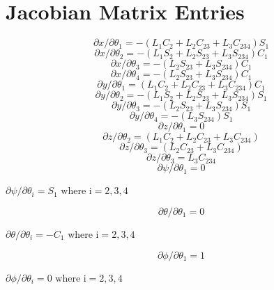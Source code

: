 \documentclass[paper=letter, fontsize=10pt]{scrartcl}	%
\numberwithin{equation}{section}															%
\numberwithin{figure}{section}																%
\numberwithin{table}{section}																%
\begin{document}
\newpage
\section{\\Jacobian Matrix Entries} \label{App:AppendixB}


\[\partial x/\partial {\theta _1} =  - ({L_1}{C_2} + {L_2}{C_{23}} + {L_3}{C_{234}}){S_1}\]
\[\partial x/\partial {\theta _2} =  - ({L_1}{S_2} + {L_2}{S_{23}} + {L_3}{S_{234}}){C_1}\]
\[\partial x/\partial {\theta _3} =  - ({L_2}{S_{23}} + {L_3}{S_{234}}){C_1}\]
\[\partial x/\partial {\theta _4} =  - ({L_2}{S_{23}} + {L_3}{S_{234}}){C_1}\]
\[\partial y/\partial {\theta _1} = ({L_1}{C_2} + {L_2}{C_{23}} + {L_3}{C_{234}}){C_1}\]
\[\partial y/\partial {\theta _2} =  - ({L_1}{S_2} + {L_2}{S_{23}} + {L_3}{S_{234}}){S_1}\]
\[\partial y/\partial {\theta _3} =  - ({L_2}{S_{23}} + {L_3}{S_{234}}){S_1}\]
\[\partial y/\partial {\theta _4} =  - ({L_3}{S_{234}}){S_1}\]
\[\partial z/\partial {\theta _1} = 0\]
\[\partial z/\partial {\theta _2} = ({L_1}{C_2} + {L_2}{C_{23}} + {L_3}{C_{234}})\]
\[\partial z/\partial {\theta _3} = ({L_2}{C_{23}} + {L_3}{C_{234}})\]
\[\partial z/\partial {\theta _3} = {L_3}{C_{234}}\]
\[\partial \psi /\partial {\theta _1} = 0\]
\begin{center}
$\partial \psi /\partial {\theta _i} = {S_1}	\text{ where i}=2,3,4$
\end{center}

\[\partial \theta /\partial {\theta _1} = 0\]
\begin{center}
$\partial \theta /\partial {\theta _i} =  - {C_1}	\text{ where i}=2,3,4$
\end{center}

\[\partial \phi /\partial {\theta _1} = 1\]
\begin{center}
$\partial \phi /\partial {\theta _i} = 0		\text{ where i}=2,3,4$
\end{center}
\newpage
\end{document}
